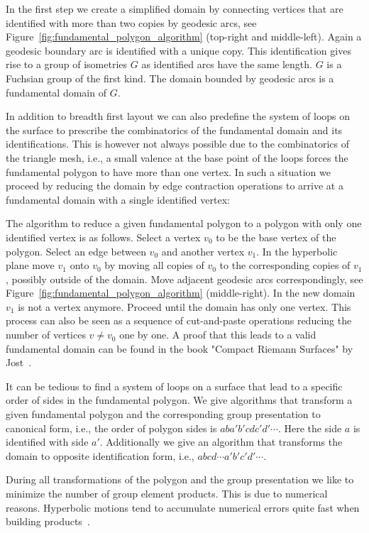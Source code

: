 \documentclass[Thesis]{subfiles}
\begin{document}
In the first step we create a simplified domain by connecting vertices that are identified with more than two copies by geodesic arcs, see Figure~\ref{fig:fundamental_polygon_algorithm} (top-right and middle-left). 
Again a geodesic boundary arc is identified with a unique copy. 
This identification gives rise to a group of isometries $G$ as identified arcs have the same length. 
$G$ is a Fuchsian group of the first kind. 
The domain bounded by geodesic arcs is a fundamental domain of $G$.

In addition to breadth first layout we can also predefine the system of loops on the surface to prescribe the combinatorics of the fundamental domain and its identifications. 
This is however not always possible due to the combinatorics of the triangle mesh, i.e., a small valence at the base point of the loops forces the fundamental polygon to have more than one vertex. 
In such a situation we proceed by reducing the domain by edge contraction operations to arrive at a fundamental domain with a single identified vertex:

The algorithm to reduce a given fundamental polygon to a polygon with only one identified vertex is as follows. 
Select a vertex $v_0$ to be the base vertex of the polygon. 
Select an edge between $v_0$ and another vertex $v_1$. 
In the hyperbolic plane move $v_1$ onto $v_0$ by moving all copies of $v_0$ to the corresponding copies of $v_1$, possibly outside of the domain. 
Move adjacent geodesic arcs correspondingly, see Figure~\ref{fig:fundamental_polygon_algorithm} (middle-right). 
In the new domain $v_1$ is not a vertex anymore. 
Proceed until the domain has only one vertex. 
This process can also be seen as a sequence of cut-and-paste operations reducing the number of vertices $v\neq v_0$ one by one. 
A proof that this leads to a valid fundamental domain can be found in the book "Compact Riemann Surfaces" by Jost~\cite[p. 48]{Jost2007}.

It can be tedious to find a system of loops on a surface that lead to a specific order of sides in the fundamental polygon. 
We give algorithms that transform a given fundamental polygon and the corresponding group presentation to canonical form, i.e., the order of polygon sides is $aba'b'cdc'd'\cdots$. 
Here the side $a$ is identified with side $a'$. 
Additionally we give an algorithm that transforms the domain to opposite identification form, i.e., $abcd\cdots a'b'c'd'\cdots$.

During all transformations of the polygon and the group presentation we like to minimize the number of group element products. 
This is due to numerical reasons. 
Hyperbolic motions tend to accumulate numerical errors quite fast when building products~\cite{Floyd2002}.
\end{document}
